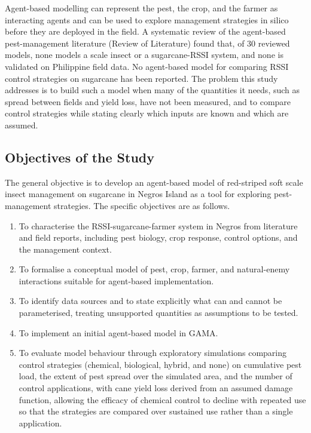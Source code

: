 Agent-based modelling can represent the pest, the crop, and the farmer as interacting agents and can be used to explore management strategies in silico before they are deployed in the field. A systematic review of the agent-based pest-management literature (Review of Literature) found that, of 30 reviewed models, none models a scale insect or a sugarcane-RSSI system, and none is validated on Philippine field data. No agent-based model for comparing RSSI control strategies on sugarcane has been reported. The problem this study addresses is to build such a model when many of the quantities it needs, such as spread between fields and yield loss, have not been measured, and to compare control strategies while stating clearly which inputs are known and which are assumed.

\subsection{Objectives of the Study}

The general objective is to develop an agent-based model of red-striped soft scale insect management on sugarcane in Negros Island as a tool for exploring pest-management strategies. The specific objectives are as follows.

\begin{enumerate}
	\item To characterise the RSSI-sugarcane-farmer system in Negros from literature and field reports, including pest biology, crop response, control options, and the management context.
	\item To formalise a conceptual model of pest, crop, farmer, and natural-enemy interactions suitable for agent-based implementation.
	\item To identify data sources and to state explicitly what can and cannot be parameterised, treating unsupported quantities as assumptions to be tested.
	\item To implement an initial agent-based model in GAMA.
	\item To evaluate model behaviour through exploratory simulations comparing control strategies (chemical, biological, hybrid, and none) on cumulative pest load, the extent of pest spread over the simulated area, and the number of control applications, with cane yield loss derived from an assumed damage function, allowing the efficacy of chemical control to decline with repeated use so that the strategies are compared over sustained use rather than a single application.
\end{enumerate}

